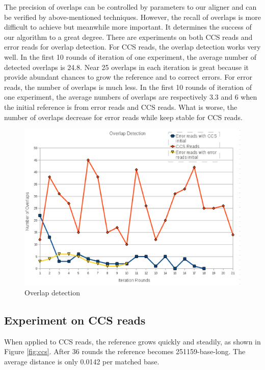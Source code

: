 \documentclass{article}
\begin{document}
The precision of overlaps can be controlled by parameters to our aligner and can
be verified by above-mentioned techniques. However, the recall of overlaps is
more difficult to achieve but meanwhile more important. It determines the
success of our algorithm to a great degree. There are experiments on both CCS
reads and error reads for overlap detection. For CCS reads, the overlap
detection works very well. In the first 10 rounds of iteration of one
experiment, the average number of detected overlaps is 24.8. Near 25 overlaps in
each iteration is great because it provide abundant chances to grow the
reference and to correct errors. For error reads, the number of overlaps is much
less. In the first 10 rounds of iteration of one experiment, the average numbers
of overlaps are respectively 3.3 and 6 when the initial reference is from error
reads and CCS reads. What is worse, the number of overlaps decrease for error
reads while keep stable for CCS reads.

\begin{figure}[t]
    \includegraphics[width=12.5cm, keepaspectratio=true]{overlap.eps}
    \caption{\label{fig:overlap}Overlap detection}
\end{figure}

\subsection{Experiment on CCS reads}

When applied to CCS reads, the reference grows quickly and steadily, as shown in
Figure \ref{fig:ccs}.  After 36 rounds the reference becomes 251159-base-long.
The average distance is only 0.0142 per matched base.
\end{document}
